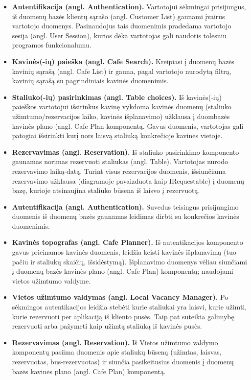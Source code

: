 \documentclass{VUMIFPSkursinis}
\begin{document}
{{{{{
\begin{itemize}
  \item \textbf{Autentifikacija (angl. Authentication).} Vartotojui sėkmingai prisijungus, iš duomenų bazės klientų sąrašo (angl. Customer List) gaunami įvairūs vartotojo duomenys. Pasinaudojus tais duomenimis pradedama vartotojo sesija (angl. User Session), kurios dėka vartotojas gali naudotis tolesniu programos funkcionalumu.
  \item \textbf{Kavinės(-ių) paieška (angl. Cafe Search).} Kreipiasi į duomenų bazės kavinių sąrašą (angl. Cafe List) ir gauna, pagal vartotojo nurodytą filtrą, kavinių sąrašą su pagrindiniais kavinės duomenimis.
  \item \textbf{Staliuko(-ių) pasirinkimas (angl. Table choices).}  Iš kavinės(-ių) paieškos vartotojui išsirinkus kavinę vykdoma kavinės duomenų (staliuko užimtumo/rezervacijos laiko, kavinės išplanavimo) užklausa į duombazės kavinės plano (angl. Cafe Plan komponentą. Gavus duomenis, vartotojas gali patogiai išsirinkti kurį nors laisvą staliuką konkrečioje kavinės vietoje.
  \item \textbf{Rezervavimas (angl. Reservation).} Iš staliuko pasirinkimo komponento gaunamas norimas rezervuoti staliukas (angl. Table). Vartotojas nurodo rezervavimo laiką-datą. Turint visus rezervacijos duomenis, išsiunčiama rezervavimo užklausa (diagramoje pavaizduota kaip IRequestable) į duomenų bazę, kurioje atsinaujina staliuko būsena iš laisvo į rezervuotą.
\end{itemize}

\begin{itemize}
  \item \textbf{Autentifikacija (angl. Authentication).} Suvedus teisingus prisijungimo duomenis iš duomenų bazės gaunamas leidimas dirbti su konkrečios kavinės duomenimis.
  \item \textbf{Kavinės topografas (angl. Cafe Planner).} Iš autentikacijos komponento gavus prieinamos kavinės duomenis, leidžia keisti kavinės išplanavimą (tuo pačiu ir staliukų skaičių, išsidėstymą). Išplanavimo duomenys vėliau siunčiami į duomenų bazės kavinės plano (angl. Cafe Plan) komponentą; naudojami vietos užimtumo valdyme.
  \item \textbf{Vietos užimtumo valdymas (angl. Local Vacancy Manager).} Po sėkmingos autentikacijos leidžia stebėti kurie staliukai yra laisvi, kurie užimti, kurie rezervuoti per aplikaciją iš kliento pusės. Taip pat suteikia galimybę rezervuoti arba pažymeti kaip užimtą staliuką iš kavinės pusės.
  \item \textbf{Rezervavimas (angl. Reservation).} Iš Vietos užimtumo valdymo komponentų pasiima duomenis apie staliukų būseną (užimtas, laisvas, rezervuotas, bus-rezervuotas) ir siunčia pasikeitusius duomenis į duomenų bazės kavinės plano (angl. Cafe Plan) komponentą.
\end{itemize}

}}}}}
\end{document}
